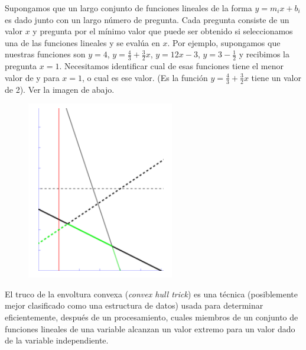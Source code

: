 Supongamos que un largo conjunto de funciones lineales de la forma $y = m_ix + b_i$ es dado junto
con un largo número de pregunta. Cada pregunta consiste de un valor $x$ y pregunta por el mínimo valor
que puede ser obtenido si seleccionamos una de las funciones lineales y se evalúa en $x$. Por ejemplo,
supongamos que nuestras funciones son $y = 4$, $y = \frac{4}{3} + \frac{3}{2}x $, $y=12x-3$, 
$y=3-\frac{1}{2}$ y recibimos la pregunta $x = 1$. Necesitamos identificar cual de esas funciones tiene el 
menor valor de y para $x = 1$, o cual es ese valor. (Es la función $y = \frac{4}{3} + \frac{3}{2}x $ tiene 
un valor de 2). Ver la imagen de abajo.

\begin{figure}[h!]
	\centering
	\includegraphics[width=0.30\linewidth]{img/convex_hull_trick}

	\label{fig:convexhulltrick}
\end{figure}


El truco de la envoltura convexa (\emph{convex hull trick}) es una técnica (posiblemente mejor clasificado como una estructura de datos) usada para determinar eficientemente, después de un procesamiento, cuales miembros de un conjunto de funciones lineales de una variable alcanzan un valor extremo para un valor dado de la variable independiente. 